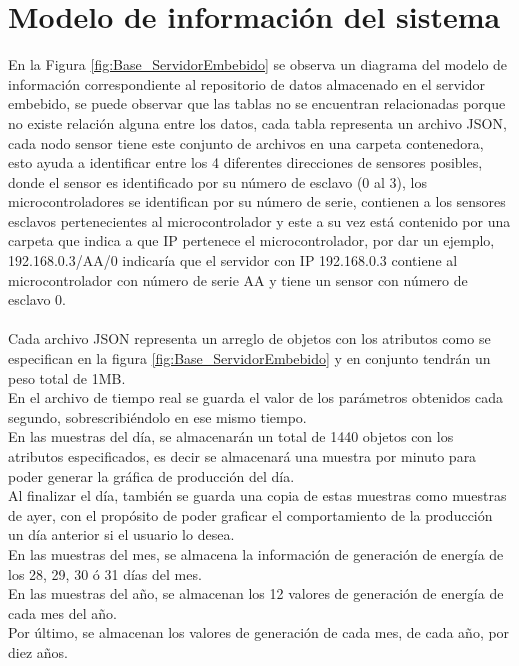 \section{Modelo de información del sistema}
En la Figura \ref{fig:Base_ServidorEmbebido} se observa un diagrama del modelo de información correspondiente al repositorio de datos almacenado en el servidor embebido, se puede observar que las tablas no se encuentran relacionadas porque no existe relación alguna entre los datos, cada tabla representa un archivo JSON, cada nodo sensor tiene este conjunto de archivos en una carpeta contenedora, esto ayuda a identificar entre los 4 diferentes direcciones de sensores posibles, donde el sensor es identificado por su número de esclavo (0 al 3), los microcontroladores se identifican por su número de serie, contienen a los sensores esclavos pertenecientes al microcontrolador y este a su vez está contenido por una carpeta que indica a que IP pertenece el microcontrolador, por dar un ejemplo, 192.168.0.3/AA/0 indicaría que el servidor con IP 192.168.0.3 contiene al microcontrolador con número de serie AA y tiene un sensor con número de esclavo 0. 
\paragraph{}
Cada archivo JSON representa un arreglo de objetos con los atributos como se especifican en la figura \ref{fig:Base_ServidorEmbebido} y en conjunto tendrán un peso total de 1MB.
\\
En el archivo de tiempo real se guarda el valor de los parámetros obtenidos cada segundo, sobrescribiéndolo en ese mismo tiempo.
\\
En las muestras del día, se almacenarán un total de 1440 objetos con los atributos especificados, es decir se almacenará una muestra por minuto para poder generar la gráfica de producción del día.
\\
Al finalizar el día, también se guarda una copia de estas muestras como muestras de ayer, con el propósito de poder graficar el comportamiento de la producción un día anterior si el usuario lo desea.
\\
En las muestras del mes, se almacena la información de generación de energía de los 28, 29, 30 ó 31 días del mes.
\\
En las muestras del año, se almacenan los 12 valores de generación de energía de cada mes del año.
\\
Por último, se  almacenan los valores de generación de cada mes, de cada año, por diez años.

